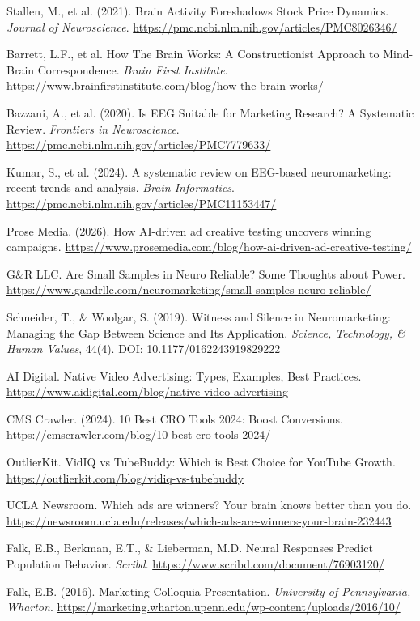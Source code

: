 \documentclass[11pt,letterpaper]{article}
\begin{document}
\begin{list}{}{\setlength{\leftmargin}{2em}\setlength{\itemindent}{-2em}\setlength{\itemsep}{2pt}}
\item[{[11]}] Stallen, M., et al. (2021). Brain Activity Foreshadows Stock Price Dynamics. \textit{Journal of Neuroscience}. \url{https://pmc.ncbi.nlm.nih.gov/articles/PMC8026346/}
\item[{[12]}] Barrett, L.F., et al. How The Brain Works: A Constructionist Approach to Mind-Brain Correspondence. \textit{Brain First Institute}. \url{https://www.brainfirstinstitute.com/blog/how-the-brain-works/}
\item[{[13]}] Bazzani, A., et al. (2020). Is EEG Suitable for Marketing Research? A Systematic Review. \textit{Frontiers in Neuroscience}. \url{https://pmc.ncbi.nlm.nih.gov/articles/PMC7779633/}
\item[{[14]}] Kumar, S., et al. (2024). A systematic review on EEG-based neuromarketing: recent trends and analysis. \textit{Brain Informatics}. \url{https://pmc.ncbi.nlm.nih.gov/articles/PMC11153447/}
\item[{[15]}] Prose Media. (2026). How AI-driven ad creative testing uncovers winning campaigns. \url{https://www.prosemedia.com/blog/how-ai-driven-ad-creative-testing/}
\item[{[16]}] G\&R LLC. Are Small Samples in Neuro Reliable? Some Thoughts about Power. \url{https://www.gandrllc.com/neuromarketing/small-samples-neuro-reliable/}
\item[{[17]}] Schneider, T., \& Woolgar, S. (2019). Witness and Silence in Neuromarketing: Managing the Gap Between Science and Its Application. \textit{Science, Technology, \& Human Values}, 44(4). DOI: 10.1177/0162243919829222
\item[{[18]}] AI Digital. Native Video Advertising: Types, Examples, Best Practices. \url{https://www.aidigital.com/blog/native-video-advertising}
\item[{[19]}] CMS Crawler. (2024). 10 Best CRO Tools 2024: Boost Conversions. \url{https://cmscrawler.com/blog/10-best-cro-tools-2024/}
\item[{[20]}] OutlierKit. VidIQ vs TubeBuddy: Which is Best Choice for YouTube Growth. \url{https://outlierkit.com/blog/vidiq-vs-tubebuddy}
\item[{[21]}] UCLA Newsroom. Which ads are winners? Your brain knows better than you do. \url{https://newsroom.ucla.edu/releases/which-ads-are-winners-your-brain-232443}
\item[{[22]}] Falk, E.B., Berkman, E.T., \& Lieberman, M.D. Neural Responses Predict Population Behavior. \textit{Scribd}. \url{https://www.scribd.com/document/76903120/}
\item[{[23]}] Falk, E.B. (2016). Marketing Colloquia Presentation. \textit{University of Pennsylvania, Wharton}. \url{https://marketing.wharton.upenn.edu/wp-content/uploads/2016/10/}

\end{list}
\end{document}
